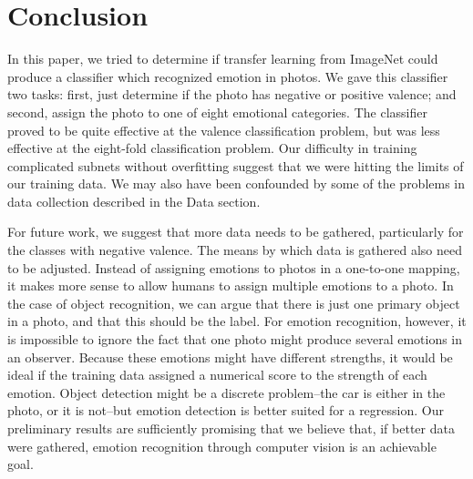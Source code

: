 \documentclass[10pt,twocolumn,letterpaper]{article}
\begin{document}
\section{Conclusion}

In this paper, we tried to determine if transfer learning from ImageNet could produce a classifier which recognized emotion in photos. We gave this classifier two tasks: first, just determine if the photo has negative or positive valence; and second, assign the photo to one of eight emotional categories. The classifier proved to be quite effective at the valence classification problem, but was less effective at the eight-fold classification problem. Our difficulty in training complicated subnets without overfitting suggest that we were hitting the limits of our training data. We may also have been confounded by some of the problems in data collection described in the Data section.

For future work, we suggest that more data needs to be gathered, particularly for the classes with negative valence. The means by which data is gathered also need to be adjusted. Instead of assigning emotions to photos in a one-to-one mapping, it makes more sense to allow humans to assign multiple emotions to a photo. In the case of object recognition, we can argue that there is just one primary object in a photo, and that this should be the label. For emotion recognition, however, it is impossible to ignore the fact that one photo might produce several emotions in an observer. Because these emotions might have different strengths, it would be ideal if the training data assigned a numerical score to the strength of each emotion. Object detection might be a discrete problem--the car is either in the photo, or it is not--but emotion detection is better suited for a regression. Our preliminary results are sufficiently promising that we believe that, if better data were gathered, emotion recognition through computer vision is an achievable goal.

{\small


}
\end{document}
